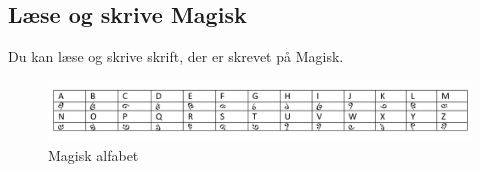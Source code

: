 \subsection*{Læse og skrive Magisk}
Du kan læse og skrive skrift, der er skrevet på Magisk.\\
\begin{figure}[H]
    \centering
    \includegraphics[width=1\textwidth]{setup/Alfabeter/Magisk alfabet.pdf}
    \caption{Magisk alfabet}
\end{figure}